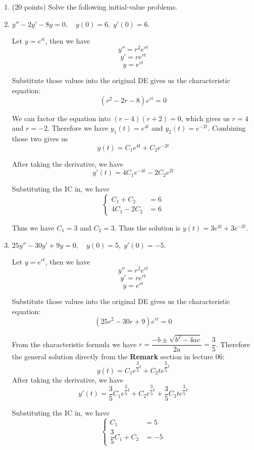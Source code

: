 \begin{enumerate}

\item (20 points) Solve the following initial-value problems.
\benum
\item 
$y''-2y'-8y=0, \quad y(0)=6, \; y'(0)=6.$

Let $y = e^{rt}$, then we have $$y'' = r^2e^{rt}$$ $$y' = re^{rt}$$  $$y = e^{rt}$$

Substitute those values into the original DE gives us the characteristic equation: $$(r^2-2r-8)e^{rt} = 0$$

We can factor the equation into $(r-4)(r+2) = 0$, which gives us $r = 4$ and $r = -2$. Therefore we have $y_1(t) = e^{4t}$ and $y_2(t) = e^{-2t}$. Combining those two gives us $$y(t) = C_1e^{4t}+C_2e^{-2t}$$

After taking the derivative, we have $$y'(t) = 4C_1e^{-4t}-2C_2e^{2t}$$

Substituting the IC in, we have 
\begin{equation*}
	\begin{cases}
		C_1+C_2 &= 6\\
		4C_1 - 2C_2 &= 6
	\end{cases}
\end{equation*}

Thus we have $C_1 = 3$ and $C_2 = 3$. Thus the solution is $y(t) = 3e^{4t}+3e^{-2t}$.

\item 
$25y''-30y'+9y=0, \quad y(0)=5, \; y'(0)=-5.$
\eenum

Let $y = e^{rt}$, then we have $$y'' = r^2e^{rt}$$ $$y' = re^{rt}$$  $$y = e^{rt}$$

Substitute those values into the original DE gives us the characteristic equation: $$(25r^2-30r+9)e^{rt} = 0$$

From the characteristic formula we have $r = \dfrac{-b \pm \sqrt{b^2 - 4ac}}{2a}=\dfrac{3}{5}$. Therefore the general solution directly from the \textbf{Remark} section in lecture 06: $$y(t) = C_1e^{\dfrac{3}{5}t}+C_2te^{\dfrac{3}{5}t}$$  
After taking the derivative, we have $$y'(t) = \dfrac{3}{5}C_1e^{\dfrac{3}{5}t}+C_2e^{\dfrac{3}{5}t}+\dfrac{3}{5}C_2te^{\dfrac{3}{5}t}$$


Substituting the IC in, we have 
\begin{equation*}
	\begin{cases}
		C_1 &= 5\\
		\dfrac{3}{5}C_1 + C_2 &= -5
	\end{cases}
\end{equation*}


\end{enumerate}
